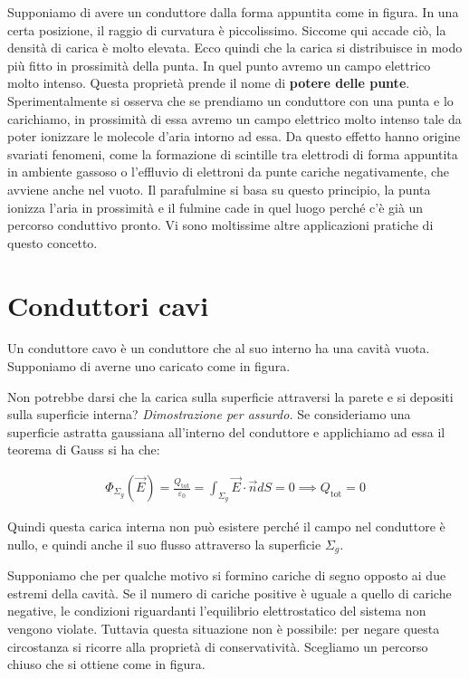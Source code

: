 Supponiamo di avere un conduttore dalla forma appuntita come in figura. In una certa posizione, il raggio di curvatura è piccolissimo. Siccome qui accade ciò, la densità di carica è molto elevata. Ecco quindi che la carica si distribuisce in modo più fitto in prossimità della punta. In quel punto avremo un campo elettrico molto intenso. Questa proprietà prende il nome di \textbf{potere delle punte}. Sperimentalmente si osserva che se prendiamo un conduttore con una punta e lo carichiamo, in prossimità di essa avremo un campo elettrico molto intenso tale da poter ionizzare le molecole d'aria intorno ad essa. Da questo effetto hanno origine svariati fenomeni, come la formazione di scintille tra elettrodi di forma appuntita in ambiente gassoso o l'effluvio di elettroni da punte cariche negativamente, che avviene anche nel vuoto.
Il parafulmine si basa su questo principio, la punta ionizza l'aria in prossimità e il fulmine cade in quel luogo perché c'è già un percorso conduttivo pronto. Vi sono moltissime altre applicazioni pratiche di questo concetto.

\section{Conduttori cavi}

Un conduttore cavo è un conduttore che al suo interno ha una cavità vuota. Supponiamo di averne uno caricato come in figura.

Non potrebbe darsi che la carica sulla superficie attraversi la parete e si depositi sulla superficie interna?
\emph{Dimostrazione per assurdo.} Se consideriamo una superficie astratta gaussiana all'interno del conduttore e applichiamo ad essa il teorema di Gauss si ha che:

\begin{gather*}
	\Phi_{\Sigma_g}(\vec{E}) = \frac{Q_{\text{tot}}}{\varepsilon_0} = \int_{\Sigma_g} \vec{E} \cdot \vec{n} dS = 0 \implies Q_{\text{tot}} = 0
\end{gather*}

Quindi questa carica interna non può esistere perché il campo nel conduttore è nullo, e quindi anche il suo flusso attraverso la superficie $ \Sigma_g  $.

Supponiamo che per qualche motivo si formino cariche di segno opposto ai due estremi della cavità. Se il numero di cariche positive è uguale a quello di cariche negative, le condizioni riguardanti l'equilibrio elettrostatico del sistema non vengono violate. Tuttavia questa situazione non è possibile: per negare questa circostanza si ricorre alla proprietà di conservatività. Scegliamo un percorso chiuso che si ottiene come in figura.


